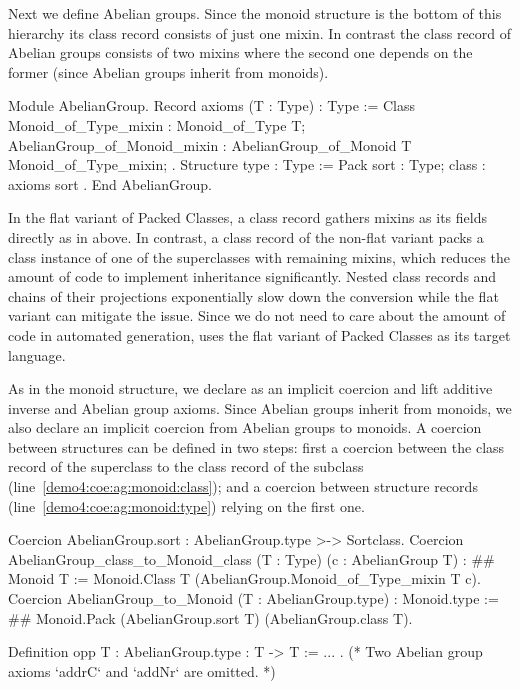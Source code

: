 \documentclass[a4paper,UKenglish,cleveref, autoref]{lipics-v2019}
\newcommand{\hb}{\coq{hierarchy-builder}}
\newcommand{\mixin}{mixin}
\newcommand{\mixins}{mixins}
\theoremstyle{implem}
\theoremstyle{implem}
\theoremstyle{command}
\theoremstyle{commands}
\begin{document}
Next we define Abelian groups.
Since the monoid structure is the bottom of this hierarchy its class record
 consists of just one \mixin{}. In contrast the class record
of Abelian groups consists of two \mixins{} where the second one depends
 on the former (since Abelian groups inherit from monoids).
\begin{coqcode}
Module AbelianGroup.
Record axioms (T : Type) : Type := Class {
  Monoid_of_Type_mixin : Monoid_of_Type T;
  AbelianGroup_of_Monoid_mixin : AbelianGroup_of_Monoid T Monoid_of_Type_mixin; }.
Structure type : Type := Pack { sort : Type; class : axioms sort }.
End AbelianGroup.
\end{coqcode}
In the flat variant of Packed Classes, a class record gathers mixins as its
fields directly as in above. In contrast, a class record of the non-flat variant
packs a class instance of one of the superclasses with remaining mixins, which
reduces the amount of code to implement inheritance significantly.
Nested class records and chains of their projections exponentially slow down the
conversion while the flat variant can mitigate the issue. Since we do not need
to care about the amount of code in automated generation, \hb{} uses the flat
variant of Packed Classes as its target language.

As in the monoid structure, we declare  as an implicit
coercion and lift additive inverse  and Abelian group axioms.
Since Abelian groups inherit from monoids, we also declare an implicit coercion
from Abelian groups to monoids. A coercion between structures can be defined
in two steps: first a coercion between the class record of the
superclass to the class record of the subclass (line~\ref{demo4:coe:ag:monoid:class});
and a coercion between
structure records (line~\ref{demo4:coe:ag:monoid:type}) relying on the first one.
\begin{coqcode}
Coercion AbelianGroup.sort : AbelianGroup.type >-> Sortclass.
Coercion AbelianGroup_class_to_Monoid_class (T : Type) (c : AbelianGroup T) : #\label{demo4:coe:ag:monoid:class}#
  Monoid T := Monoid.Class T (AbelianGroup.Monoid_of_Type_mixin T c).
Coercion AbelianGroup_to_Monoid (T : AbelianGroup.type) : Monoid.type := #\label{demo4:coe:ag:monoid:type}#
  Monoid.Pack (AbelianGroup.sort T) (AbelianGroup.class T).

Definition opp {T : AbelianGroup.type} : T -> T := ... .
(* Two Abelian group axioms `addrC` and `addNr` are omitted. *)
\end{coqcode}
\end{document}
